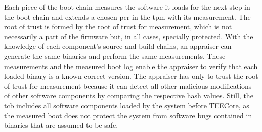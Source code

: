 Each piece of the boot chain measures the software it loads for the next step in
the boot chain and extends a chosen \gls{pcr} in the \gls{tpm} with its
measurement. The root of trust is formed by the root of trust for measurement,
which is not necessarily a part of the firmware but, in all cases, specially
protected. With the knowledge of each component's source and build chains, an
appraiser can generate the same binaries and perform the same measurements.
These measurements and the measured boot log enable the appraiser to verify that
each loaded binary is a known correct version. The appraiser has only to trust
the root of trust for measurement because it can detect all other malicious
modifications of other software components by comparing the respective hash
values. Still, the \gls{tcb} includes all software components loaded by the
system before TEECore, as the measured boot does not protect the system from
software bugs contained in binaries that are assumed to be safe.

